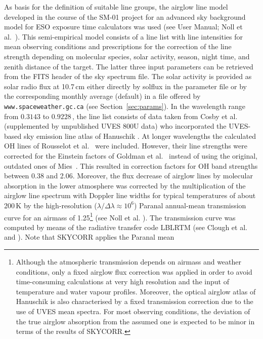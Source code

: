 As basis for the definition of suitable line groups, the airglow line model
developed in the course of the SM-01 project for an advanced sky background
model for \ac{ESO} exposure time calculators was used (see \cite{SM01} User
Manual; Noll et al.~\cite{NOL12}). This semi-empirical model consists of a line
list with line intensities for mean observing conditions and prescriptions for
the correction of the line strength depending on molecular species, solar
activity, season, night time, and zenith distance of the target. The latter
three input parameters can be retrieved from the \ac{FITS} header of the sky
spectrum file. The solar activity is provided as solar radio flux at 10.7\,cm
either directly by {\sc solflux} in the parameter file or by the corresponding
monthly average (default) in a file offered by {\tt www.spaceweather.gc.ca}
(see Section~\ref{sec:params}). In the wavelength range from $0.3143$ to
$0.9228$\,\mum{}, the line list consists of data taken from Cosby et
al.~\cite{COS06} (supplemented by unpublished UVES 800U data) who incorporated
the UVES-based sky emission line atlas of Hanuschik \cite{HAN03}. At longer
wavelengths the calculated OH lines of Rousselot et al.~\cite{ROU00} were
included. However, their line strengths were corrected for the Einstein factors
of Goldman et al.~\cite{GOL98} instead of using the original, outdated ones of
Mies~\cite{MIE74}. This resulted in correction factors for OH band strengths
between 0.38 and 2.06. Moreover, the flux decrease of airglow lines by
molecular absorption in the lower atmosphere was corrected by the
multiplication of the airglow line spectrum with Doppler line widths for
typical temperatures of about 200\,K by the high-resolution
($\lambda / \Delta\lambda \approx 10^6$) Paranal annual-mean transmission
curve for an airmass of 1.25\footnote{Although the atmospheric
transmission depends on airmass and weather conditions, only a fixed airglow
flux correction was applied in order to avoid time-consuming calculations at
very high resolution and the input of temperature and water vapour profiles.
Moreover, the optical airglow atlas of Hanuschik \cite{HAN03} is also
characterised by a fixed transmission correction due to the use of UVES mean
spectra. For most observing conditions, the deviation of the true airglow
absorption from the assumed one is expected to be minor in terms of the results
of SKYCORR.} (see Noll et al. \cite{NOL12}). The transmission curve was
computed by means of the radiative transfer code LBLRTM (see Clough et al.
\cite{CLO05} and \cite{LBLRTM}). Note that SKYCORR applies the Paranal mean
